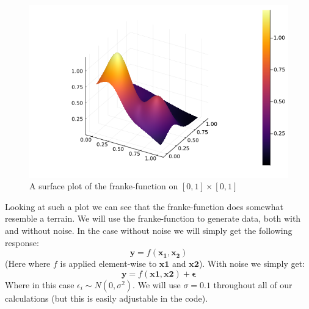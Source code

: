 \documentclass{article}
\begin{document}
\begin{figure}
    \includegraphics[scale=0.5]{frankefunction}
    \caption{A surface plot of the franke-function on $\left[ 0, 1 \right] \times \left[ 0, 1 \right]$}
    \label{franke-function-plot}
\end{figure}

Looking at such a plot we can see that the franke-function does somewhat
resemble a terrain. We will use the franke-function to generate data, both with
and without noise.  In the case without noise we will simply get the
following response:
$$\mathbf{y} = f(\mathbf{x_1}, \mathbf{x_2})$$
(Here where $f$ is applied element-wise to $\mathbf{x1}$ and $\mathbf{x2}$).
With noise we simply get:
$$\mathbf{y} = f(\mathbf{x1}, \mathbf{x2}) + \mathbf{\epsilon}$$
Where in this case $\epsilon_i \sim N(0, \sigma^2)$. We will use $\sigma = 0.1$
throughout all of our calculations (but this is easily adjustable in the code).
\end{document}
